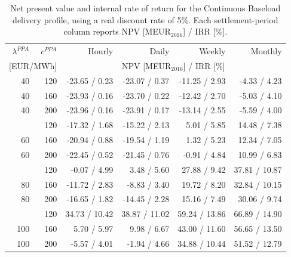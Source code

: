\begin{table}[H]
\centering
\small
\caption{Net present value and internal rate of return for the Continuous Baseload delivery profile, using a real discount rate of 5\%. Each settlement-period column reports NPV [MEUR$_{2016}$] / IRR [\%].}
\label{tab:npv_irr_continuous_baseload}
\begin{tabular*}{\textwidth}{@{\extracolsep{\fill}}rrrrrr@{}}
\toprule
$\lambda^{PPA}$ & $c^{PPA}$ & Hourly & Daily & Weekly & Monthly \\
\multicolumn{2}{c}{[EUR/MWh]} & \multicolumn{4}{c}{NPV [MEUR$_{2016}$] / IRR [\%]} \\
\midrule
40 & 120 & -23.65 / 0.23 & -23.07 / 0.37 & -11.25 / 2.93 & -4.33 / 4.23 \\
40 & 160 & -23.93 / 0.16 & -23.70 / 0.22 & -12.42 / 2.70 & -5.03 / 4.10 \\
40 & 200 & -23.96 / 0.16 & -23.91 / 0.17 & -13.14 / 2.55 & -5.59 / 4.00 \\
\addlinespace
60 & 120 & -17.32 / 1.68 & -15.22 / 2.13 & 5.01 / 5.85 & 14.48 / 7.38 \\
60 & 160 & -20.94 / 0.88 & -19.54 / 1.19 & 1.32 / 5.23 & 12.34 / 7.05 \\
60 & 200 & -22.45 / 0.52 & -21.45 / 0.76 & -0.91 / 4.84 & 10.99 / 6.83 \\
\addlinespace
80 & 120 & -0.07 / 4.99 & 3.48 / 5.60 & 27.88 / 9.42 & 37.81 / 10.87 \\
80 & 160 & -11.72 / 2.83 & -8.83 / 3.40 & 19.72 / 8.20 & 32.84 / 10.15 \\
80 & 200 & -16.65 / 1.82 & -14.45 / 2.28 & 15.16 / 7.49 & 30.06 / 9.74 \\
\addlinespace
100 & 120 & 34.73 / 10.42 & 38.87 / 11.02 & 59.24 / 13.86 & 66.89 / 14.90 \\
100 & 160 & 5.70 / 5.97 & 9.98 / 6.67 & 43.00 / 11.60 & 56.65 / 13.50 \\
100 & 200 & -5.57 / 4.01 & -1.94 / 4.66 & 34.88 / 10.44 & 51.52 / 12.79 \\
\bottomrule
\end{tabular*}
\end{table}
